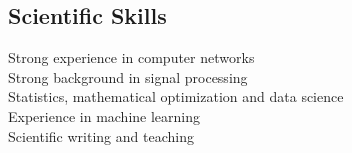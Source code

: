 \begin{resume}
\pagebreak
\section{Scientific Skills}
Strong experience in computer networks\\
Strong background in signal processing \\
Statistics, mathematical optimization and data science \\
Experience in machine learning \\
Scientific writing and teaching \\


%
%
%
%
%
%


\end{resume}
